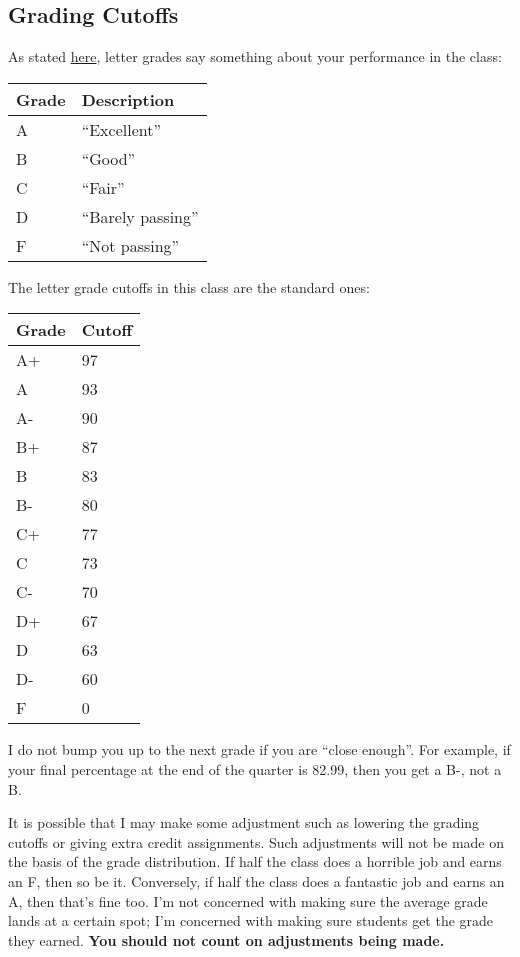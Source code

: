 \documentclass{article}
\begin{document}
\subsection{Grading Cutoffs}

As stated \href{https://registrar.ucdavis.edu/records/grades/letter}{here}, letter grades say something about your performance in the class:

\begin{tabular}{|l|l|}
\hline
Grade & Description \\ \hline
A     & ``Excellent''     \\ \hline
B     & ``Good''     \\ \hline
C     & ``Fair''     \\ \hline
D     & ``Barely passing''     \\ \hline
F     & ``Not passing''      \\ \hline
\end{tabular}

\vspace{1em}
The letter grade cutoffs in this class are the standard ones:

\begin{tabular}{|l|l|}
\hline
Grade & Cutoff \\ \hline
A+    & 97     \\ \hline
A     & 93     \\ \hline
A-    & 90     \\ \hline
B+    & 87     \\ \hline
B     & 83     \\ \hline
B-    & 80     \\ \hline
C+    & 77     \\ \hline
C     & 73     \\ \hline
C-    & 70     \\ \hline
D+    & 67     \\ \hline
D     & 63     \\ \hline
D-    & 60     \\ \hline
F     & 0      \\ \hline
\end{tabular}

\vspace{1em}
I do not bump you up to the next grade if you are ``close enough''. For example, if your final percentage at the end of the quarter is 82.99, then you get a B-, not a B.

It is possible that I may make some adjustment such as lowering the grading cutoffs or giving extra credit assignments. Such adjustments will not be made on the basis of the grade distribution. If half the class does a horrible job and earns an F, then so be it. Conversely, if half the class does a fantastic job and earns an A, then that's fine too. I'm not concerned with making sure the average grade lands at a certain spot; I'm concerned with making sure students get the grade they earned. \textbf{You should not count on adjustments being made.}
\end{document}
